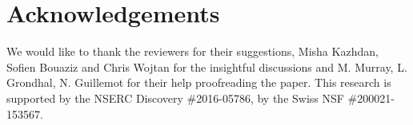 \section*{Acknowledgements}
\begin{draft}
We would like to thank the reviewers for their suggestions, Misha Kazhdan, Sofien Bouaziz and Chris Wojtan for the insightful discussions and M. Murray, L. Grondhal, N. Guillemot for their help proofreading the paper. This research is supported by the NSERC Discovery \#2016-05786, by the Swiss NSF \#200021-153567.
\end{draft}